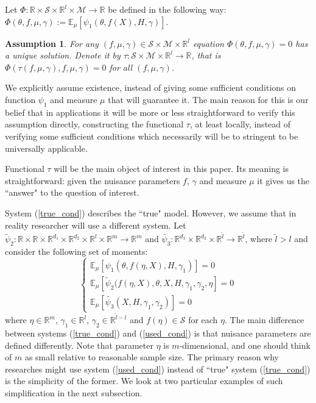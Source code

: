 \documentclass[12pt]{article}
\theoremstyle{plain}
\newtheorem{assumption}[theorem]{Assumption}
\begin{document}
Let $\Phi : \mathbb{R}\times \mathcal{S}\times \mathbb{R}^{l}\times \mathcal{M}\rightarrow \mathbb{R}$ be defined in the following way: $\Phi(\theta, f, \mu, \gamma):=  \mathbb{E}_{\mu}[\psi_1(\theta, f(X), H,\gamma)]$.

\begin{assumption}\label{func_exist}
For any $(f,\mu,\gamma)\in \mathcal{S}\times \mathcal{M}\times \mathbb{R}^{l}$ equation $\Phi(\theta, f, \mu, \gamma)=0$ has a unique solution. Denote it by  $\tau: \mathcal{S}\times \mathcal{M}\times \mathbb{R}^{l}\rightarrow \mathbb{R}$, that is $\Phi(\tau(f,\mu,\gamma),f,\mu,\gamma)=0$ for all $(f,\mu,\gamma)$.
\end{assumption}

We explicitly assume existence, instead of giving some sufficient conditions on function $\psi_1$ and measure $\mu$ that will guarantee it. The main reason for this is our belief that in applications it will be more or less straightforward to verify this assumption directly, constructing the functional $\tau$, at least locally, instead of verifying some sufficient conditions which necessarily will be  to stringent to be universally applicable. 

Functional $\tau$ will be the main object of interest in this paper. Its meaning is straightforward: given the nuisance parameters $f$, $\gamma$ and measure $\mu$ it gives us the ``answer" to the question of interest. 

System (\ref{true_cond}) describes the ``true" model. However, we assume that in reality researcher will use a different system. Let  $\tilde{\psi}_2:\mathbb{R}\times\mathbb{R}\times\mathbb{R}^{d_1}\times \mathbb{R}^{d_2}\times \mathbb{R}^l\times\mathbb{R}^m \rightarrow \mathbb{R}^{m}$ and $\tilde{\psi_3}: \mathbb{R}^{d_1}\times\mathbb{R}^{d_2}\times \mathbb{R}^{\tilde l} \rightarrow \mathbb{R}^{\tilde{l}}$, where $\tilde{l}>l$ and consider the following set of moments:
\begin{equation}\label{used_cond}
\begin{cases}
\mathbb{E}_{\mu}[\psi_1(\theta, f(\eta,X), H,\gamma_1)] = 0\\
\mathbb{E}_{\mu}[\tilde{\psi}_2(f(\eta,X),\theta,X,H,\gamma_1,\gamma_2,\eta]=0\\
\mathbb{E}_{\mu}[\tilde{\psi_3}(X,H,\gamma_1,\gamma_2)] = 0
\end{cases}
\end{equation}
where $\eta \in \mathbb{R}^m$, $\gamma_1\in \mathbb{R}^l$, $\gamma_2\in \mathbb{R}^{\tilde{l} - l}$ and $f(\eta)\in \mathcal{S}$ for each $\eta$. The main difference between systems (\ref{true_cond}) and (\ref{used_cond}) is that nuisance parameters are defined differently. Note that parameter $\eta$ is $m$-dimensional, and one should think of $m$ as small relative to reasonable sample size. The primary reason why researches might use system (\ref{used_cond}) instead of ``true" system (\ref{true_cond}) is the simplicity of the former. We look at two particular examples of such simplification in the next subsection.
\end{document}
